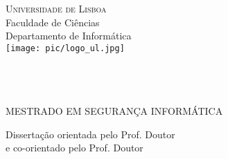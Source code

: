 \begin{center}
\vspace{3cm}\normalfont\normalfont
\textsc{\huge{Universidade de Lisboa}}\\
\LARGE{Faculdade de Ci\^{e}ncias}\\
\Large{Departamento de Inform\'{a}tica}\\
\vspace{0.9cm}
\texttt{[image: pic/logo\_ul.jpg]}\\
\vspace{1.9cm}
\PEIIdiomaTese
\Large{\bf \PEITITULO}\\
\vspace{1.4 cm}
\Large{\bf \PEIAutor}\\
\vspace{1.9 cm}
\Large{\bf \PEITIPO}\\
\end{center}
\vspace{0.4 cm}
\begin{center}
\Large{MESTRADO EM SEGURANÇA INFORM\'{A}TICA}\\

\end{center}
\vspace{1 cm}
Disserta\c{c}\~{a}o orientada pelo Prof. Doutor \PEIOrientador \\
e co-orientado pelo Prof. Doutor \PEICoOrientador \\
\vspace{-0.2cm} 
\begin{center}
\large\PEIAno
\end{center}
\newpage
\thispagestyle{empty}
\mbox{}
\newpage
